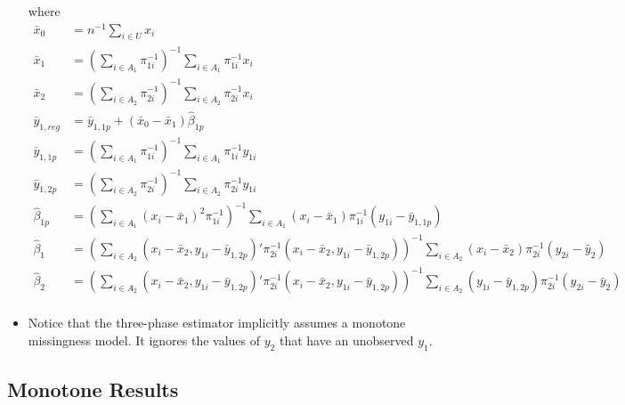 \begin{itemize}
    where 
    \begin{align*}
      \bar x_0 &= n^{-1} \sum_{i \in U} x_i \\
      \bar x_1 &= \left(\sum_{i \in A_1} \pi_{1i}^{-1}\right)^{-1} 
                  \sum_{i \in A_1} \pi_{1i}^{-1} x_i\\
      \bar x_2 &= \left(\sum_{i \in A_2} \pi_{2i}^{-1}\right)^{-1} 
                  \sum_{i \in A_2} \pi_{2i}^{-1} x_i\\
      \bar y_{1, reg} &= \bar y_{1, 1p} + (\bar x_0 - \bar x_1)\hat \beta_{1p}\\
      \bar y_{1, 1p} &= \left(\sum_{i \in A_1} \pi_{1i}^{-1}\right)^{-1} 
                        \sum_{i \in A_1} \pi_{1i}^{-1} y_{1i}\\
      \bar y_{1, 2p} &= \left(\sum_{i \in A_2} \pi_{2i}^{-1}\right)^{-1} 
                        \sum_{i \in A_2} \pi_{2i}^{-1} y_{1i}\\
      \hat \beta_{1p} &= \left(\sum_{i \in A_1} (x_i - \bar x_1)^2
      \pi_{1i}^{-1}\right)^{-1} \sum_{i \in A_1} (x_i - \bar x_1)\pi_{1i}^{-1}
      (y_{1i} - \bar y_{1, 1p})\\
      \hat \beta_1 &= \left(\sum_{i \in A_2} (x_i - \bar x_2, y_{1i} - \bar
      y_{1, 2p})' \pi_{2i}^{-1} (x_i - \bar x_2, y_{1i} - \bar y_{1,
      2p})\right)^{-1} \sum_{i \in A_2} (x_i - \bar x_2) \pi_{2i}^{-1} (y_{2i} -
      \bar y_2)\\
      \hat \beta_2 &= \left(\sum_{i \in A_2} (x_i - \bar x_2, y_{1i} - \bar
      y_{1, 2p})' \pi_{2i}^{-1} (x_i - \bar x_2, y_{1i} - \bar y_{1,
      2p})\right)^{-1} \sum_{i \in A_2} (y_{1i} - \bar y_{1, 2p}) \pi_{2i}^{-1} 
      (y_{2i} - \bar y_2)\\
    \end{align*}

  \item Notice that the three-phase estimator implicitly assumes a monotone 
    missingness model. It ignores the values of $y_2$ that have an unobserved
    $y_1$.

\end{itemize}

\subsection*{Monotone Results}

